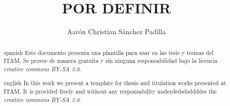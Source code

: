 \documentclass{tesisITAM}
\title{POR DEFINIR}
\author{Aarón Christian Sánchez Padilla}
\begin{document}
	\maketitle
	\publicationrights


	\begin{abstract}{spanish}
		Este documento presenta una plantilla para usar en las tesis y tesinas del ITAM. Se provee de manera gratuita y sin ninguna responsabilidad bajo la licencia \emph{creative commons BY-SA 3.0}.
	\end{abstract}

	\begin{abstract}{english}
		In this work we present a template for thesis and titulation works presented at ITAM. It is provided freely and without any responsability underdedsdsddddss the \emph{creative commons BY-SA 3.0}. 
	\end{abstract}


	\setcounter{page}{1}

	\tableofcontents
	\newpage

	\setcounter{page}{1}


	
	
	

	\appendix

	\clearpage
	
	{}
	
	
\end{document}
